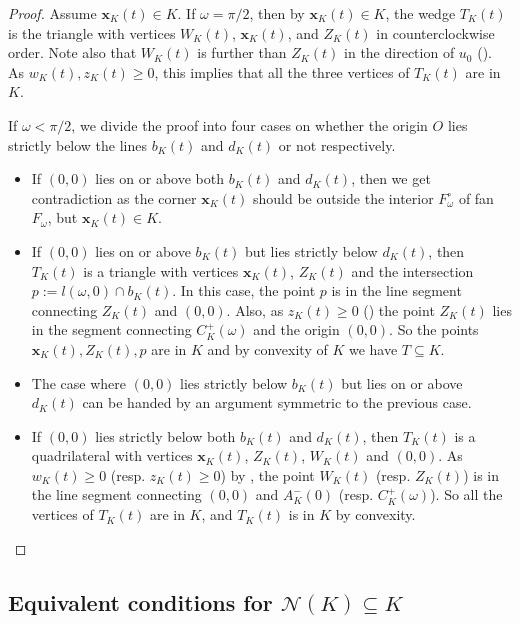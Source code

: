 \begin{proof}
Assume \(\mathbf{x}_K(t) \in K\). If \(\omega = \pi/2\), then by \(\mathbf{x}_K(t) \in K\), the wedge \(T_K(t)\) is the triangle with vertices \(W_K(t)\), \(\mathbf{x}_K(t)\), and \(Z_K(t)\) in counterclockwise order. Note also that \(W_K(t)\) is further than \(Z_K(t)\) in the direction of \(u_0\) (). As \(w_K(t), z_K(t) \geq 0\), this implies that all the three vertices of \(T_K(t)\) are in \(K\).

If \(\omega < \pi/2\), we divide the proof into four cases on whether the origin \(O\) lies strictly below the lines \(b_K(t)\) and \(d_K(t)\) or not respectively.

\begin{itemize}
\tightlist
\item
  If \((0, 0)\) lies on or above both \(b_K(t)\) and \(d_K(t)\), then we get contradiction as the corner \(\mathbf{x}_K(t)\) should be outside the interior \(F_\omega^\circ\) of fan \(F_\omega\), but \(\mathbf{x}_K(t) \in K\).
\item
  If \((0, 0)\) lies on or above \(b_K(t)\) but lies strictly below \(d_K(t)\), then \(T_K(t)\) is a triangle with vertices \(\mathbf{x}_K(t)\), \(Z_K(t)\) and the intersection \(p := l(\omega, 0) \cap b_K(t)\). In this case, the point \(p\) is in the line segment connecting \(Z_K(t)\) and \((0, 0)\). Also, as \(z_K(t) \geq 0\) () the point \(Z_K(t)\) lies in the segment connecting \(C^+_K(\omega)\) and the origin \((0, 0)\). So the points \(\mathbf{x}_K(t), Z_K(t), p\) are in \(K\) and by convexity of \(K\) we have \(T \subseteq K\).
\item
  The case where \((0, 0)\) lies strictly below \(b_K(t)\) but lies on or above \(d_K(t)\) can be handed by an argument symmetric to the previous case.
\item
  If \((0, 0)\) lies strictly below both \(b_K(t)\) and \(d_K(t)\), then \(T_K(t)\) is a quadrilateral with vertices \(\mathbf{x}_K(t)\), \(Z_K(t)\), \(W_K(t)\) and \((0, 0)\). As \(w_K(t) \geq 0\) (resp. \(z_K(t) \geq 0\)) by , the point \(W_K(t)\) (resp. \(Z_K(t)\)) is in the line segment connecting \((0, 0)\) and \(A^-_K(0)\) (resp. \(C^+_K(\omega)\)). So all the vertices of \(T_K(t)\) are in \(K\), and \(T_K(t)\) is in \(K\) by convexity.
\end{itemize}

\end{proof}

\subsection{\texorpdfstring{Equivalent conditions for \(\mathcal{N}(K) \subseteq K\)}{Equivalent conditions for \textbackslash mathcal\{N\}(K) \textbackslash subseteq K}}

